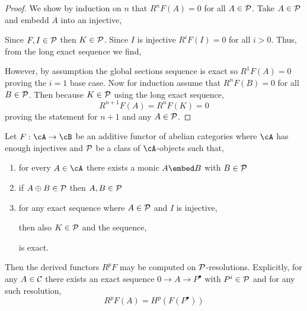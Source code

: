 \documentclass[12pt]{article}
\begin{document}
\begin{proof}
We show by induction on $n$ that $R^n F(A) = 0$ for all $A \in \mathcal{P}$. Take $A \in \mathcal{P}$ and embedd $A$ into an injective,
\begin{center}
\end{center}
Since $F, I \in \mathcal{P}$ then $K \in \mathcal{P}$. Since $I$ is injective $R^i F(I) = 0$ for all $i  > 0$. Thus, from the long exact sequence we find,
\begin{center}
\end{center} 
\begin{center}
\end{center} 
However, by assumption the global sections sequence is exact so $R^1 F(A) = 0$ proving the $i = 1$ base case. Now for induction assume that $R^n F(B) = 0$ for all $B \in \mathcal{P}$. Then  because $K \in \mathcal{P}$ using the long exact sequence,
\[ R^{n+1} F(A) = R^n F(K) = 0 \]
proving the statement for $n + 1$ and any $A \in \mathcal{P}$. 
\end{proof}

\begin{prop}
Let $F : \cA \to \cB$ be an additive functor of abelian categories where $\cA$ has enough injectives and $\mathcal{P}$ be a class of $\cA$-objects such that,
\begin{enumerate}
\item for every $A \in \cA$ there exists a monic $A \embed B$ with $B \in \mathcal{P}$
\item if $A \oplus B \in \mathcal{P}$ then $A, B \in \mathcal{P}$
\item for any exact sequence where $A \in \mathcal{P}$ and $I$ is injective,
\begin{center}
\end{center} 
then also $K \in \mathcal{P}$ and the sequence,
\begin{center}
\end{center}
is exact.
\end{enumerate}
Then the derived functors $R^p F$ may be computed on $\mathcal{P}$-resolutions. Explicitly, for any $A \in \mathcal{C}$ there exists an exact sequence $0 \to A \to P^\bullet$ with $P^i \in \mathcal{P}$ and for any such resolution,
\[ R^p F(A) = H^p(F(P^\bullet)) \]
\end{prop}
\end{document}
